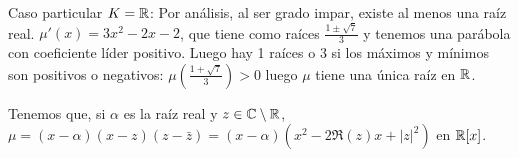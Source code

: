 Caso particular \(K=\mathbb{R}\): Por análisis, al ser grado impar, existe al menos
una raíz real. \(\mu'(x)=3x^2-2x-2\), que tiene como raíces
\(\frac{1\pm\sqrt{7}}{3}\) y tenemos una parábola con coeficiente líder
positivo. Luego hay 1 raíces o 3 si los máximos y mínimos son positivos
o negativos: \(\mu(\frac{1+\sqrt{7}}{3})>0\) luego \(\mu\) tiene una única
raíz en \(\mathbb{R}\).

Tenemos que, si \(\alpha\) es la raíz real y \(z\in\mathbb{C}\setminus\mathbb{R}\),
\(\mu=(x-\alpha)(x-z)(z-\bar{z})=(x-\alpha)(x^2-2\Re(z)x+|z|^2)\) en \(\mathbb{R}[x]\).

